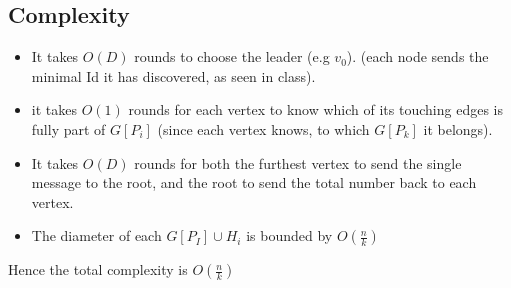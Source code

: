 \documentclass[11pt]{article}
\begin{document}
\begin{enumerate}
\subsection*{Complexity}
\begin{itemize}
    \item It takes $O(D)$ rounds to choose the leader (e.g $v_0$). (each node sends the minimal Id it has discovered, as seen in class).
    \item it takes $O(1)$ rounds for each vertex to know which of its touching edges is fully part of $G[P_i]$ (since each vertex knows, to which $ G[P_k] $ it belongs).
    \item It takes $O(D)$ rounds for both the furthest vertex to send the single message to the root, and the root to send the total number back to each vertex.
    \item The diameter of each $G[P_I] \cup H_i$ is bounded by $O(\frac{n}{k})$
\end{itemize}
Hence the total complexity is $O(\frac{n}{k})$

\end{enumerate}
\end{document}
